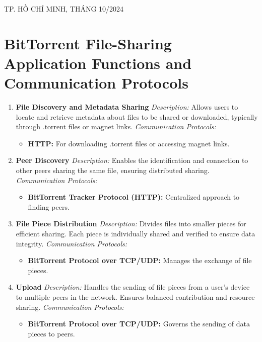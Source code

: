 \documentclass[a4paper]{article}
\begin{document}
\begin{titlepage}
\begin{center}
{\footnotesize TP. HỒ CHÍ MINH, THÁNG 10/2024}
\end{center}
\end{titlepage}

\newpage
\tableofcontents
\newpage

\section{BitTorrent File-Sharing Application Functions and Communication Protocols}

\begin{enumerate}[label=\textbf{\arabic*.}, leftmargin=30pt, itemsep=10pt]
    \item \textbf{File Discovery and Metadata Sharing}  
    \textit{Description:} Allows users to locate and retrieve metadata about files to be shared or downloaded, typically through .torrent files or magnet links.  
    \textit{Communication Protocols:}
    \begin{itemize}
        \item \textbf{HTTP:} For downloading .torrent files or accessing magnet links.
    \end{itemize}

    \item \textbf{Peer Discovery}  
    \textit{Description:} Enables the identification and connection to other peers sharing the same file, ensuring distributed sharing.  
    \textit{Communication Protocols:}
    \begin{itemize}
        \item \textbf{BitTorrent Tracker Protocol (HTTP):} Centralized approach to finding peers.
    \end{itemize}

    \item \textbf{File Piece Distribution}  
    \textit{Description:} Divides files into smaller pieces for efficient sharing. Each piece is individually shared and verified to ensure data integrity.  
    \textit{Communication Protocols:}
    \begin{itemize}
        \item \textbf{BitTorrent Protocol over TCP/UDP:} Manages the exchange of file pieces.
    \end{itemize}

    \item \textbf{Upload}  
    \textit{Description:} Handles the sending of file pieces from a user's device to multiple peers in the network. Ensures balanced contribution and resource sharing.  
    \textit{Communication Protocols:}
    \begin{itemize}
        \item \textbf{BitTorrent Protocol over TCP/UDP:} Governs the sending of data pieces to peers.
    \end{itemize}


\end{enumerate}
\end{document}
